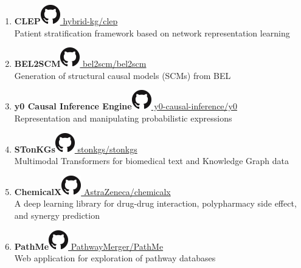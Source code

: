 \documentclass[10pt,a4paper,sans]{moderncv} %
\begin{document}
\begin{enumerate}
        \item \textbf{CLEP}\hfill\href{https://github.com/hybrid-kg/clep}{\includegraphics[scale=0.25]{img/GitHub-Mark-32px} hybrid-kg/clep}
\\
    Patient stratification framework based on network representation learning

        \item \textbf{BEL2SCM}\hfill\href{https://github.com/bel2scm/bel2scm}{\includegraphics[scale=0.25]{img/GitHub-Mark-32px} bel2scm/bel2scm}
\\
    Generation of structural causal models (SCMs) from BEL

        \item \textbf{y0 Causal Inference Engine}\hfill\href{https://github.com/y0-causal-inference/y0}{\includegraphics[scale=0.25]{img/GitHub-Mark-32px} y0-causal-inference/y0}
\\
    Representation and manipulating probabilistic expressions

        \item \textbf{STonKGs}\hfill\href{https://github.com/stonkgs/stonkgs}{\includegraphics[scale=0.25]{img/GitHub-Mark-32px} stonkgs/stonkgs}
\\
    Multimodal Transformers for biomedical text and Knowledge Graph data

        \item \textbf{ChemicalX}\hfill\href{https://github.com/AstraZeneca/chemicalx}{\includegraphics[scale=0.25]{img/GitHub-Mark-32px} AstraZeneca/chemicalx}
\\
    A deep learning library for drug-drug interaction, polypharmacy side effect, and synergy prediction

        \item \textbf{PathMe}\hfill\href{https://github.com/PathwayMerger/PathMe}{\includegraphics[scale=0.25]{img/GitHub-Mark-32px} PathwayMerger/PathMe}
\\
    Web application for exploration of pathway databases


\end{enumerate}
\end{document}
